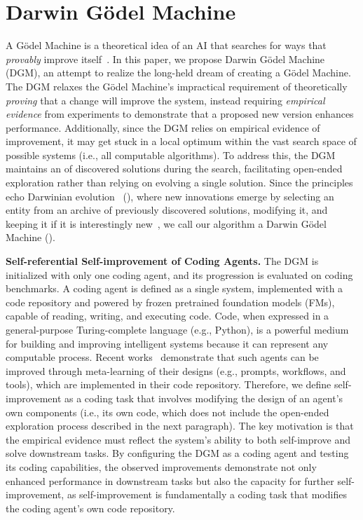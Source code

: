 \section{Darwin G\"odel Machine}
\label{sec:methods}

A G\"odel Machine is a theoretical idea of an AI that searches for ways that \emph{provably} improve itself~\citep{schmidhuber2007godel}. In this paper, we propose Darwin G\"odel Machine (DGM), an attempt to realize the long-held dream of creating a G\"odel Machine. The DGM relaxes the G\"odel Machine's impractical requirement of theoretically \emph{proving} that a change will improve the system, instead requiring \emph{empirical evidence} from experiments to demonstrate that a proposed new version enhances performance. Additionally, since the DGM relies on empirical evidence of improvement, it may get stuck in a local optimum within the vast search space of possible systems (i.e., all computable algorithms). To address this, the DGM maintains an \StateSymbol{} of discovered solutions during the search, facilitating open-ended exploration rather than relying on evolving a single solution. Since the principles echo Darwinian evolution~\citep{darwin2023origin} (), where new innovations emerge by selecting an entity from an archive of previously discovered solutions, modifying it, and keeping it if it is interestingly new~\citep{zhang2024omni, faldor2025omni, stanley2015greatness}, we call our algorithm a Darwin G\"odel Machine ().

\textbf{Self-referential Self-improvement of Coding Agents.}
The DGM is initialized with only one coding agent, and its progression is evaluated on coding benchmarks. A coding agent is defined as a single system, implemented with a code repository and powered by frozen pretrained foundation models (FMs), capable of reading, writing, and executing code. Code, when expressed in a general-purpose Turing-complete language (e.g., Python), is a powerful medium for building and improving intelligent systems because it can represent any computable process. Recent works~\citep{hu2025automated, zhang2024aflow} demonstrate that such agents can be improved through meta-learning of their designs (e.g., prompts, workflows, and tools), which are implemented in their code repository. Therefore, we define self-improvement as a coding task that involves modifying the design of an agent's own components (i.e., its own code, which does not include the open-ended exploration process described in the next paragraph). The key motivation is that the empirical evidence must reflect the system's ability to both self-improve and solve downstream tasks. By configuring the DGM as a coding agent and testing its coding capabilities, the observed improvements demonstrate not only enhanced performance in downstream tasks but also the capacity for further self-improvement, as self-improvement is fundamentally a coding task that modifies the coding agent's own code repository.

